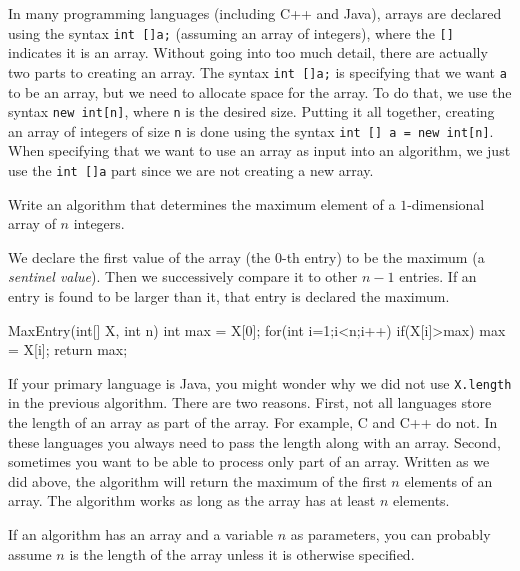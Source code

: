 In many programming languages
(including C++ and Java), arrays are declared using
the syntax 
\verb+int []a;+ (assuming an array of integers), 
where the \verb+[]+ indicates it is an array.
Without going into too much detail, there are actually two
parts to creating an array. The syntax \verb+int []a;+
is specifying that we want \verb+a+ to be an array, but
we need to allocate space for the array. To do that, we use
the syntax \verb+new int[n]+, where \verb+n+ is the 
desired size. Putting it all together, creating an array of
integers of size \verb+n+ is done using the syntax
\verb+int [] a = new int[n]+.
When specifying that we want to use an array as input
into an algorithm, we just use the \verb+int []a+ part since
we are not creating a new array.

\begin{exa}
Write an algorithm that determines the maximum element of a $1$-dimensional array of $n$ integers.
\begin{sol}
We declare the first value of the array (the $0$-th entry) to be the maximum (a {\em sentinel value}). 
Then we successively compare it to other $n - 1$ entries. 
If an entry is found to be larger than it, that entry is declared the maximum.
\begin{code}
MaxEntry(int[] X, int n) {
    int max = X[0];
    for(int i=1;i<n;i++) {
        if(X[i]>max) {
            max = X[i];
        }
    }
    return max;
}
\end{code}
\end{sol}
\end{exa}

If your primary language is Java, you might wonder why we did not use \verb+X.length+ in the previous
algorithm.  There are two reasons.  First, not all languages store the length of an array as part
of the array.  For example, C and C++ do not.  In these languages you always need to pass the length
along with an array.  Second, sometimes you want to be able to process only part of an array.  
Written as we did above, the algorithm will return the maximum of the first $n$ elements
of an array.  The algorithm works as long as the array has at least $n$ elements.


\begin{rem}
If an algorithm has an array and a variable $n$ as parameters, you can probably assume $n$ is
the length of the array unless it is otherwise specified.
\end{rem}

